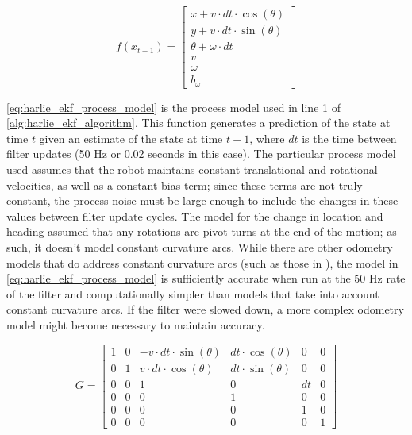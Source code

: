 \begin{equation}
	f\left(x_{t-1}\right) =
	\begin{bmatrix}
		x + v \cdot dt \cdot \cos\left(\theta\right) \\
		y + v \cdot dt \cdot \sin\left(\theta\right)  \\
		\theta + \omega \cdot dt \\
		v \\
		\omega \\
		b_{\omega}
	\end{bmatrix}
	\label{eq:harlie_ekf_process_model}
\end{equation}

\eqref{eq:harlie_ekf_process_model} is the process model used in line 1 of \autoref{alg:harlie_ekf_algorithm}. This function generates a prediction of the state at time $t$ given an estimate of the state at time $t-1$, where $dt$ is the time between filter updates (50 Hz or 0.02 seconds in this case). The particular process model used assumes that the robot maintains constant translational and rotational velocities, as well as a constant bias term; since these terms are not truly constant, the process noise must be large enough to include the changes in these values between filter update cycles. The model for the change in location and heading assumed that any rotations are pivot turns at the end of the motion; as such, it doesn't model constant curvature arcs. While there are other odometry models that do address constant curvature arcs (such as those in \autocite{ProbRobotics}), the model in \eqref{eq:harlie_ekf_process_model} is sufficiently accurate when run at the 50 Hz rate of the filter and computationally simpler than models that take into account constant curvature arcs. If the filter were slowed down, a more complex odometry model might become necessary to maintain accuracy. 

\begin{equation}
	G =
	\begin{bmatrix}
		1 & 0 & -v \cdot dt \cdot \sin\left(\theta\right) & dt \cdot \cos\left(\theta\right) & 0 & 0 \\
		0 & 1 & v \cdot dt \cdot \cos\left(\theta\right) & dt \cdot \sin\left(\theta\right) & 0 & 0 \\
		0 & 0 & 1 & 0 & dt & 0 \\
		0 & 0 & 0 & 1 & 0 & 0 \\
		0 & 0 & 0 & 0 & 1 & 0 \\
		0 & 0 & 0 & 0 & 0 & 1 
	\end{bmatrix}
	\label{eq:harlie_ekf_process_jacobian}
\end{equation}

